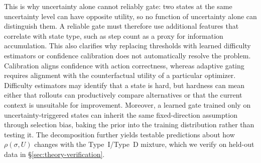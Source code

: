 This is why uncertainty alone cannot reliably gate: two states at the same uncertainty level can have opposite utility, so no function of uncertainty alone can distinguish them. A reliable gate must therefore use additional features that correlate with state type, such as step count as a proxy for information accumulation. This also clarifies why replacing thresholds with learned difficulty estimators or confidence calibration does not automatically resolve the problem. Calibration aligns confidence with action correctness, whereas adaptive gating requires alignment with the counterfactual utility of a particular optimizer. Difficulty estimators may identify that a state is hard, but hardness can mean either that rollouts can productively compare alternatives or that the current context is unsuitable for improvement. Moreover, a learned gate trained only on uncertainty-triggered states can inherit the same fixed-direction assumption through selection bias, baking the prior into the training distribution rather than testing it. The decomposition further yields testable predictions about how $\rho(\sigma, U)$ changes with the Type~I/Type~D mixture, which we verify on held-out data in \S\ref{sec:theory-verification}.


